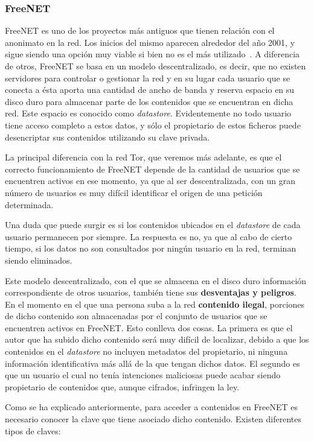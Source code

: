 \subsubsection {FreeNET}

FreeNET es uno de los proyectos más antiguos que tienen relación con el anonimato en la red. Los inicios del mismo aparecen alrededor del año 2001, y sigue siendo una opción muy viable si bien no es el más utilizado~\cite{article:freenet}. A diferencia de otros, FreeNET se basa en un modelo descentralizado, es decir, que no existen servidores para controlar o gestionar la red y en su lugar cada usuario que se conecta a ésta aporta una cantidad de ancho de banda y reserva espacio en su disco duro para almacenar parte de los contenidos que se encuentran en dicha red. 
Este espacio es conocido como \textit{datastore}. Evidentemente no todo usuario tiene acceso completo a estos datos, y sólo el propietario de estos ficheros puede desencriptar sus contenidos utilizando su clave privada.

La principal diferencia con la red Tor, que veremos más adelante, es que el correcto funcionamiento de FreeNET depende de la cantidad de usuarios que se encuentren activos en ese momento, ya que al ser descentralizada, con un gran número de usuarios es muy difícil identificar el origen de una petición determinada. 

Una duda que puede surgir es si los contenidos ubicados en el \textit{datastore} de cada usuario permanecen por siempre. La respuesta es no, ya que al cabo de cierto tiempo, si los datos no son consultados por ningún usuario en la red, terminan siendo eliminados.

Este modelo descentralizado, con el que se almacena en el disco duro información correspondiente de otros usuarios, también tiene sus \textbf{desventajas y peligros}. En el momento en el que una persona suba a la red \textbf{contenido ilegal}, porciones de dicho contenido son almacenadas por el conjunto de usuarios que se encuentren activos en FreeNET. Esto conlleva dos cosas.
La primera es que el autor que ha subido dicho contenido será muy difícil de localizar, debido a que los contenidos en el \textit{datastore} no incluyen metadatos del propietario, ni ninguna información identificativa más allá de la que tengan dichos datos.
El segundo es que un usuario el cual no tenía intenciones maliciosas puede acabar siendo propietario de contenidos que, aunque cifrados, infringen la ley.

Como se ha explicado anteriormente, para acceder a contenidos en FreeNET es necesario conocer la clave que tiene asociado dicho contenido. Existen diferentes tipos de claves:

